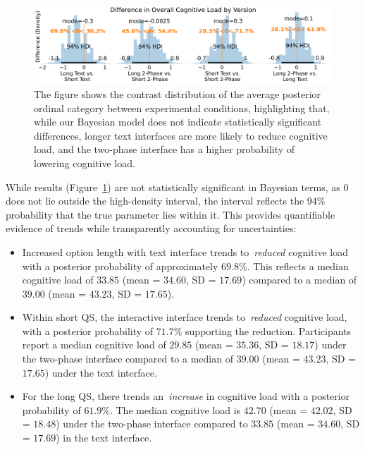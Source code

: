 \begin{figure}[h]
    \centering
    \includegraphics[width=\textwidth]{content/image/cog/weighted_cog_version_single_row.pdf}
    \caption{The figure shows the contrast distribution of the average posterior ordinal category between experimental conditions, highlighting that, while our Bayesian model does not indicate statistically significant differences, longer text interfaces are more likely to reduce cognitive load, and the two-phase interface has a higher probability of lowering cognitive load.}
    \label{fig:weighted_cog_version}
\end{figure}

While results (Figure~\ref{fig:weighted_cog_version}) are not statistically significant in Bayesian terms, as 0 does not lie outside the high-density interval, the interval reflects the 94\% probability that the true parameter lies within it. This provides quantifiable evidence of trends while transparently accounting for uncertainties:
\begin{itemize}
    \item Increased option length with text interface trends to~\textit{reduced} cognitive load with a posterior probability of approximately $69.8\%$. This reflects a median cognitive load of $33.85$ (mean = $34.60$, SD = $17.69$) compared to a median of $39.00$ (mean = $43.23$, SD = $17.65$).
    \item Within short QS, the interactive interface trends to~\textit{reduced} cognitive load, with a posterior probability of $71.7\%$ supporting the reduction. Participants report a median cognitive load of $29.85$ (mean = $35.36$, SD = $18.17$) under the two-phase interface compared to a median of $39.00$ (mean = $43.23$, SD = $17.65$) under the text interface.
    \item For the long QS, there trends an~\textit{increase} in cognitive load with a posterior probability of $61.9\%$. The median cognitive load is $42.70$ (mean = $42.02$, SD = $18.48$) under the two-phase interface compared to $33.85$ (mean = $34.60$, SD = $17.69$) in the text interface.
\end{itemize}

